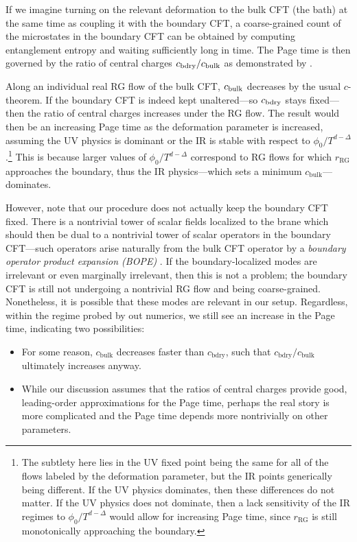 \documentclass[12pt,a4paper]{article}
\begin{document}
If we imagine turning on the relevant deformation to the bulk CFT (the bath) at the same time as coupling it with the boundary CFT, a coarse-grained count of the microstates in the boundary CFT can be obtained by computing entanglement entropy and waiting sufficiently long in time. The Page time is then governed by the ratio of central charges $c_{\rm bdry}/c_{\rm bulk}$ as demonstrated by \cite{Rozali:2019day}.

Along an individual real RG flow of the bulk CFT, $c_{\rm bulk}$ decreases by the usual $c$-theorem. If the boundary CFT is indeed kept unaltered---so $c_{\rm bdry}$ stays fixed---then the ratio of central charges increases under the RG flow. The result would then be an increasing Page time as the deformation parameter is increased, assuming the UV physics is dominant or the IR is stable with respect to $\phi_0/T^{d-\Delta}$.\footnote{The subtlety here lies in the UV fixed point being the same for all of the flows labeled by the deformation parameter, but the IR points generically being different. If the UV physics dominates, then these differences do not matter. If the UV physics does not dominate, then a lack sensitivity of the IR regimes to $\phi_0/T^{d-\Delta}$ would allow for increasing Page time, since $r_{\text{RG}}$ is still monotonically approaching the boundary.} This is because larger values of $\phi_0/T^{d-\Delta}$ correspond to RG flows for which $r_{\text{RG}}$ approaches the boundary, thus the IR physics---which sets a minimum $c_{\text{bulk}}$---dominates.

However, note that our procedure does not actually keep the boundary CFT fixed. There is a nontrivial tower of scalar fields localized to the brane which should then be dual to a nontrivial tower of scalar operators in the boundary CFT---such operators arise naturally from the bulk CFT operator by a \textit{boundary operator product expansion (BOPE)} \cite{Karch:2017fuh}. If the boundary-localized modes are irrelevant or even marginally irrelevant, then this is not a problem; the boundary CFT is still not undergoing a nontrivial RG flow and being coarse-grained. Nonetheless, it is possible that these modes are relevant in our setup. Regardless, within the regime probed by out numerics, we still see an increase in the Page time, indicating two possibilities:
\begin{itemize}
\item[(1)] For some reason, $c_{\text{bulk}}$ decreases faster than $c_{\text{bdry}}$, such that $c_{\text{bdry}}/c_{\text{bulk}}$ ultimately increases anyway.

\item[(2)] While our discussion assumes that the ratios of central charges provide good, leading-order approximations for the Page time, perhaps the real story is more complicated and the Page time depends more nontrivially on other parameters.
\end{itemize}
\end{document}
